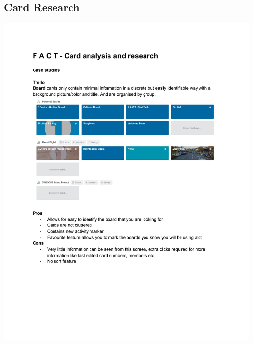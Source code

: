 
\begin{appendices}
\chapter{Card Research}
\label{appendix:cardResearch}
\includegraphics[page=1,scale=0.8]{cardResearch.pdf}

\end{appendices}